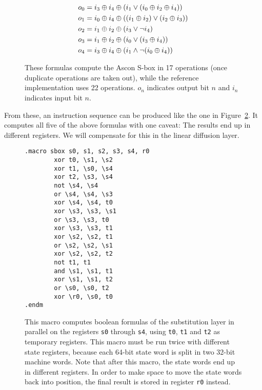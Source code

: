 \begin{figure}
\begin{align*}
   o_0 & = i_3 \oplus i_4 \oplus (i_1 \vee (i_0 \oplus i_2 \oplus i_4))
\\ o_1 & = i_0 \oplus i_4 \oplus ((i_1 \oplus i_2) \vee (i_2 \oplus i_3))
\\ o_2 & = i_1 \oplus i_2 \oplus (i_3 \vee \neg i_4)
\\ o_3 & = i_1 \oplus i_2 \oplus (i_0 \vee (i_3 \oplus i_4))
\\ o_4 & = i_3 \oplus i_4 \oplus (i_1 \wedge \neg (i_0 \oplus i_4))
\end{align*}

\caption{These formulas compute the Ascon S-box in 17 operations (once duplicate
operations are taken out), while the reference implementation uses 22
operations. $o_n$ indicates output bit $n$ and $i_n$ indicates input bit $n$.}

\label{shortformulas}
\end{figure}

From these, an instruction sequence can be produced like the one in
Figure~\ref{substitution}. It computes all five of the above formulas with one
caveat: The results end up in different registers. We will compensate
for this in the linear diffusion layer.


\begin{figure}[p]
\begin{verbatim}
.macro sbox s0, s1, s2, s3, s4, r0
        xor t0, \s1, \s2
        xor t1, \s0, \s4
        xor t2, \s3, \s4
        not \s4, \s4
        or \s4, \s4, \s3
        xor \s4, \s4, t0
        xor \s3, \s3, \s1
        or \s3, \s3, t0
        xor \s3, \s3, t1
        xor \s2, \s2, t1
        or \s2, \s2, \s1
        xor \s2, \s2, t2
        not t1, t1
        and \s1, \s1, t1
        xor \s1, \s1, t2
        or \s0, \s0, t2
        xor \r0, \s0, t0
.endm
\end{verbatim}

\caption{This macro computes boolean formulas of the substitution layer in
parallel on the registers \texttt{s0} through \texttt{s4}, using \texttt{t0},
\texttt{t1} and \texttt{t2} as temporary registers. This macro must be run
twice with different state registers, because each 64-bit state word is split in
two 32-bit machine words. Note that after this macro, the state words end up
in different registers. In order to make space to move the state words back into
position, the final result is stored in register \texttt{r0} instead.}

\label{substitution}
\end{figure}

